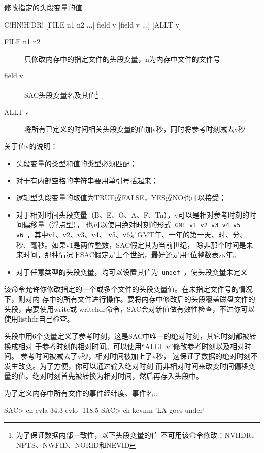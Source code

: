 \label{cmd:chnhdr}

修改指定的头段变量的值

\begin{SACSTX}
C!HN!H!DR! [FILE n1 n2 ...] field v [field v ...] [ALLT v]
\end{SACSTX}

\begin{description}
\item [FILE n1 n2] 只修改内存中的指定文件的头段变量，n为内存中文件的文件号
\item [field v] SAC头段变量名及其值\footnote{为了保证数据内部一致性，以下头段变量的值
    不可用该命令修改：NVHDR、NPTS、NWFID、NORID和NEVID}
\item [ALLT v] 将所有已定义的时间相关头段变量的值加v秒，同时将参考时刻减去v秒
\end{description}

关于值v的说明：
\begin{itemize}
\item 头段变量的类型和值的类型必须匹配；
\item 对于有内部空格的字符串要用单引号括起来；
\item 逻辑型头段变量的取值为TRUE或FALSE，YES或NO也可以接受；
\item 对于相对时间头段变量（B、E、O、A、F、Tn），v可以是相对参考时刻的时间偏移量（浮点型），
    也可以使用绝对时刻的形式~\lstinline{GMT v1 v2 v3 v4 v5 v6}~，其中v1、v2、v3、v4、
    v5、v6是GMT年、一年的第一天、时、分、秒、毫秒。如果v1是两位整数，SAC假定其为当前世纪，
    除非那个时间是未来时间，那种情况下SAC假定是上个世纪，最好还是用4位整数表示年。
\item 对于任意类型的头段变量，均可以设置其值为~\lstinline{undef}~，使头段变量未定义
\end{itemize}

该命令允许你修改指定的一个或多个文件的头段变量值。在未指定文件号的情况下，则对内
存中的所有文件进行操作。要将内存中修改后的头段覆盖磁盘文件的头段，需要使用write或
writehdr命令，SAC会对新值做有效性检查，不过你可以使用listhdr自己检查。

头段中用6个变量定义了参考时刻，这是SAC中唯一的绝对时刻，其它时刻都被转换成相对
于参考时刻的相对时间。可以使用``ALLT v''修改参考时刻以及相对时间。
参考时间被减去了v秒，相对时间被加上了v秒，
这保证了数据的绝对时刻不发生改变。为了方便，你可以通过输入绝对时刻
而非相对时间来改变时间偏移变量的值。绝对时刻首先被转换为相对时间，然后再存入头段中。

为了定义内存中所有文件的事件经纬度、事件名::
\begin{SACCode}
SAC> ch evla 34.3 evlo -118.5
SAC> ch kevnm 'LA goes under'
\end{SACCode}


